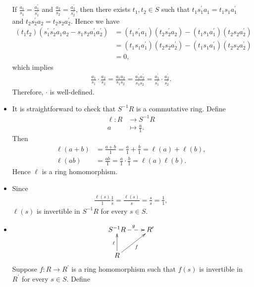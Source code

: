 \begin{solution}
\begin{itemize}
        If $\frac{a_1}{s_1} = \frac{a_1^\prime}{s_1^\prime}$ and $\frac{a_2}{s_2} = \frac{a_2^\prime}{s_2^\prime}$, then there exists $t_1,t_2\in S$ such that $t_1s_1^\prime a_1= t_1s_1 a_1^\prime$ and $t_2s_2^\prime a_2= t_2s_2 a_2^\prime$. Hence we have
        \begin{align*}
           (t_1t_2)(s_1^\prime s_2^\prime a_1a_2 - s_1 s_2 a_1^\prime a_2^\prime)&=(t_1s_1^\prime a_1 )( t_2s_2^\prime a_2) -(t_1 s_1a_1^\prime )  (t_2s_2a_2^\prime )\\
           &=(t_1s_1 a_1^\prime )( t_2s_2 a_2^\prime) -(t_1 s_1a_1^\prime )  (t_2s_2a_2^\prime )\\
           &=0,
        \end{align*}
        which implies
        \begin{align*}
            \frac{a_1}{s_1}\cdot \frac{a_2}{s_2}=\frac{a_1a_2}{s_1s_2}= \frac{a_1^\prime a_2^\prime}{s_1^\prime s_2^\prime}=\frac{a_1^\prime}{s_1^\prime}\cdot \frac{a_2^\prime}{s_2^\prime}.
        \end{align*}
        Therefore, $\cdot$ is well-defined.
        \item It is straightforward to check that $S^{-1} R$ is a commutative ring. Define
        \begin{align*}
            \ell: R &\longrightarrow S^{-1} R\\
            a &\longmapsto \frac{a}{1}.
        \end{align*}
        Then
        \begin{align*}
            \ell(a+b)&=\frac{a+b}{1}=\frac{a}{1}+\frac{b}{1}= \ell(a)+\ell(b),\\
            \ell(ab)&=\frac{ab}{1}=\frac{a}{1}\cdot\frac{b}{1}=\ell(a)\ell(b).
        \end{align*}
        Hence $\ell$ is a ring homomorphism.
        \item Since
        \begin{align*}
            \frac{\ell(s)}{1}\frac{1}{s}=\frac{\ell(s)}{s}=\frac{s}{s}=\frac{1}{1},
        \end{align*}
        $\ell(s)$ is invertible in $S^{-1}R$ for every $s \in S$.
        \item 
        \[\xymatrix{
			S^{-1}R
            \ar@{-->}[r]^{g} & R'\\
			R\ar[ru]_{f}\ar[u]^{\ell} &    
		}\]
        Suppose $f: R \rightarrow R^{\prime}$ is a ring homomorphism such that $f(s)$ is invertible in $R^{\prime}$ for every $s \in S$. Define
        \begin{align*}

\end{align*}
\end{itemize}
\end{solution}
